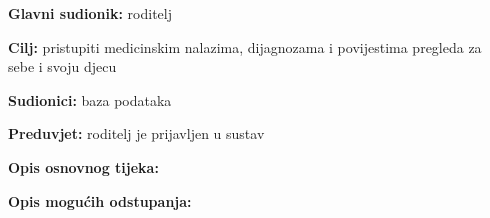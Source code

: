                      \noindent {}
					\begin{packed_item}
	
						\item \textbf{Glavni sudionik: }roditelj
						\item  \textbf{Cilj:} pristupiti medicinskim nalazima, dijagnozama i povijestima pregleda za sebe i svoju djecu
						\item  \textbf{Sudionici:} baza podataka
						\item  \textbf{Preduvjet:} roditelj je prijavljen u sustav
						\item  \textbf{Opis osnovnog tijeka:}
						
						\item[] \begin{packed_enum}
	
							\item 
							\item 
							\item 

						\end{packed_enum}
						
						\item  \textbf{Opis mogućih odstupanja:}
						
						\item[] \begin{packed_item}
	
							\item[2.a] 
							\item[] \begin{packed_enum}
								
								\item 
								\item 
							\end{packed_enum}
							
						\end{packed_item}
					\end{packed_item}

